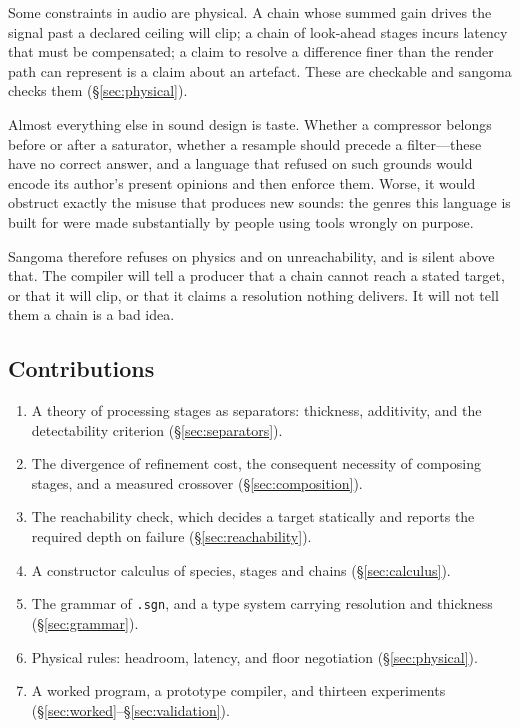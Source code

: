 \documentclass[11pt,twocolumn,a4paper]{article}
\theoremstyle{definition}
\theoremstyle{remark}
\begin{document}
Some constraints in audio are physical. A chain whose summed gain drives the
signal past a declared ceiling will clip; a chain of look-ahead stages incurs
latency that must be compensated; a claim to resolve a difference finer than the
render path can represent is a claim about an artefact. These are checkable and
sangoma checks them (\S\ref{sec:physical}).

Almost everything else in sound design is taste. Whether a compressor belongs
before or after a saturator, whether a resample should precede a filter---these
have no correct answer, and a language that refused on such grounds would encode
its author's present opinions and then enforce them. Worse, it would obstruct
exactly the misuse that produces new sounds: the genres this language is built
for were made substantially by people using tools wrongly on purpose.

Sangoma therefore refuses on physics and on unreachability, and is silent above
that. The compiler will tell a producer that a chain cannot reach a stated
target, or that it will clip, or that it claims a resolution nothing delivers. It
will not tell them a chain is a bad idea.

\subsection{Contributions}

\begin{enumerate}[label=(\roman*),leftmargin=2.2em]
\item A theory of processing stages as separators: thickness, additivity, and the
  detectability criterion (\S\ref{sec:separators}).
\item The divergence of refinement cost, the consequent necessity of composing
  stages, and a measured crossover (\S\ref{sec:composition}).
\item The reachability check, which decides a target statically and reports the
  required depth on failure (\S\ref{sec:reachability}).
\item A constructor calculus of species, stages and chains
  (\S\ref{sec:calculus}).
\item The grammar of \texttt{.sgn}, and a type system carrying resolution and
  thickness (\S\ref{sec:grammar}).
\item Physical rules: headroom, latency, and floor negotiation
  (\S\ref{sec:physical}).
\item A worked program, a prototype compiler, and thirteen experiments
  (\S\ref{sec:worked}--\S\ref{sec:validation}).
\end{enumerate}
\end{document}
